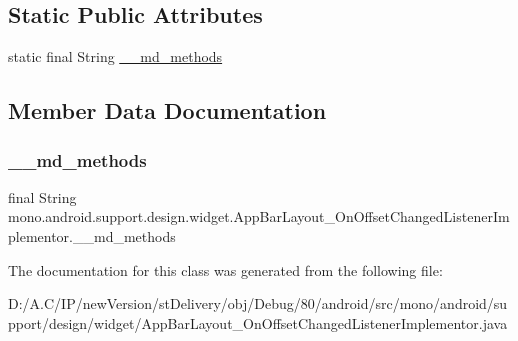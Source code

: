 \subsection*{Static Public Attributes}
\begin{DoxyCompactItemize}
\item 
static final String \hyperlink{classmono_1_1android_1_1support_1_1design_1_1widget_1_1_app_bar_layout___on_offset_changed_listener_implementor_a881f917db1121db046dd9110ea6e5a23}{\+\_\+\+\_\+md\+\_\+methods}
\end{DoxyCompactItemize}


\subsection{Member Data Documentation}
\mbox{\label{classmono_1_1android_1_1support_1_1design_1_1widget_1_1_app_bar_layout___on_offset_changed_listener_implementor_a881f917db1121db046dd9110ea6e5a23}} 
\subsubsection{\texorpdfstring{\+\_\+\+\_\+md\+\_\+methods}{\_\_md\_methods}}
{\footnotesize\ttfamily final String mono.\+android.\+support.\+design.\+widget.\+App\+Bar\+Layout\+\_\+\+On\+Offset\+Changed\+Listener\+Implementor.\+\_\+\+\_\+md\+\_\+methods\hspace{0.3cm}{\ttfamily [static]}}



The documentation for this class was generated from the following file\+:\begin{DoxyCompactItemize}
\item 
D\+:/\+A.\+C/\+I\+P/new\+Version/st\+Delivery/obj/\+Debug/80/android/src/mono/android/support/design/widget/App\+Bar\+Layout\+\_\+\+On\+Offset\+Changed\+Listener\+Implementor.\+java\end{DoxyCompactItemize}
